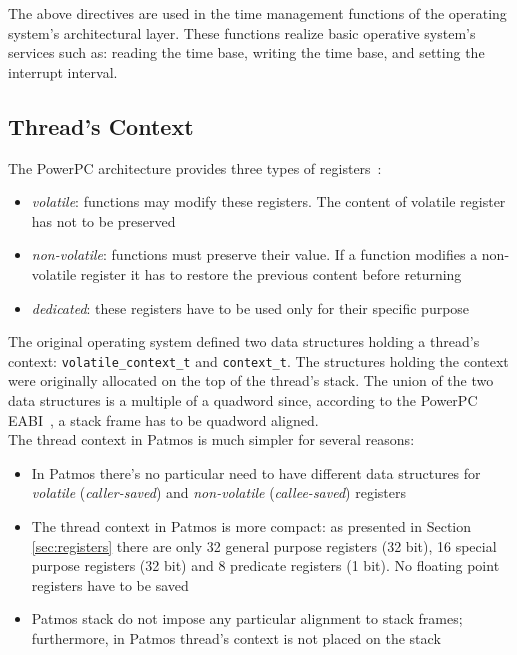 The above directives are used in the time management functions of the operating system's architectural layer. These functions realize basic operative system's services such as: reading the time base, writing the time base, and setting the interrupt interval. 

\subsection{Thread's Context}\label{sec:thread context}

The PowerPC architecture provides three types of registers~\cite{PPCEABI:1998}:
\begin{itemize}
	\item \textit{volatile}: functions may modify these registers. The content of volatile register has not to be preserved
	\item \textit{non-volatile}: functions must preserve their value. If a function modifies a non-volatile register it has to restore the previous content before returning
	\item \textit{dedicated}: these registers have to be used only for their specific purpose
\end{itemize}

The original operating system defined two data structures holding a thread's context: \texttt{volatile\_context\_t} and \texttt{context\_t}. The structures holding the context were originally allocated on the top of the thread's stack. The union of the two data structures is a multiple of a quadword since, according to the PowerPC EABI~\cite{PPCEABI:1998}, a stack frame has to be quadword aligned.\\

The thread context in Patmos is much simpler for several reasons:
\begin{itemize}
	\item In Patmos there's no particular need to have different data structures for \textit{volatile} (\textit{caller-saved}) and \textit{non-volatile} (\textit{callee-saved}) registers
	\item The thread context in Patmos is more compact: as presented in Section \ref{sec:registers} there are only 32 general purpose registers (32 bit), 16 special purpose registers (32 bit) and 8 predicate registers (1 bit). No floating point registers have to be saved
	\item Patmos stack do not impose any particular alignment to stack frames; furthermore, in Patmos thread's context is not placed on the stack
\end{itemize}

